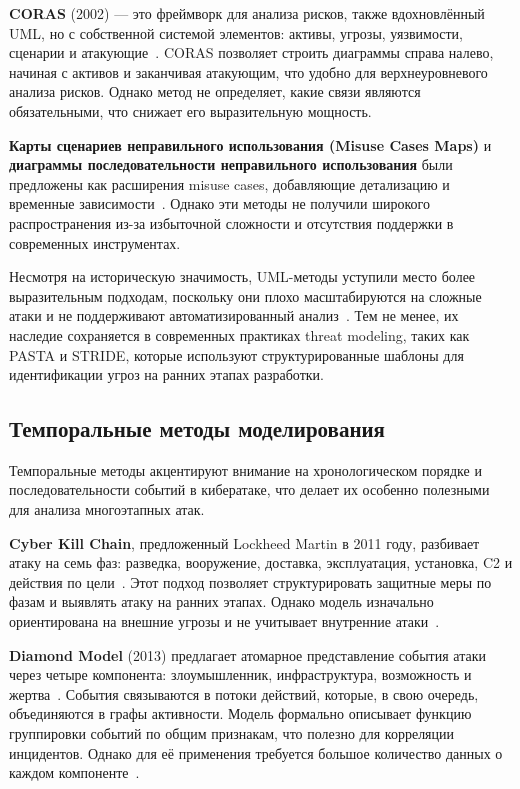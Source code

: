 \documentclass{article}
\begin{document}
\textbf{CORAS} (2002) — это фреймворк для анализа рисков, также вдохновлённый UML, но с собственной системой элементов: активы, угрозы, уязвимости, сценарии и атакующие~\cite{Neiman2024a}. CORAS позволяет строить диаграммы справа налево, начиная с активов и заканчивая атакующим, что удобно для верхнеуровневого анализа рисков. Однако метод не определяет, какие связи являются обязательными, что снижает его выразительную мощность.

\textbf{Карты сценариев неправильного использования (Misuse Cases Maps)} и \textbf{диаграммы последовательности неправильного использования} были предложены как расширения misuse cases, добавляющие детализацию и временные зависимости~\cite{Neiman2024a}. Однако эти методы не получили широкого распространения из-за избыточной сложности и отсутствия поддержки в современных инструментах.

Несмотря на историческую значимость, UML-методы уступили место более выразительным подходам, поскольку они плохо масштабируются на сложные атаки и не поддерживают автоматизированный анализ~\cite{Lallie2019}. Тем не менее, их наследие сохраняется в современных практиках threat modeling, таких как PASTA и STRIDE, которые используют структурированные шаблоны для идентификации угроз на ранних этапах разработки.

\subsection{Темпоральные методы моделирования}

Темпоральные методы акцентируют внимание на хронологическом порядке и последовательности событий в кибератаке, что делает их особенно полезными для анализа многоэтапных атак.

\textbf{Cyber Kill Chain}, предложенный Lockheed Martin в 2011 году, разбивает атаку на семь фаз: разведка, вооружение, доставка, эксплуатация, установка, C2 и действия по цели~\cite{Neiman2024b}. Этот подход позволяет структурировать защитные меры по фазам и выявлять атаку на ранних этапах. Однако модель изначально ориентирована на внешние угрозы и не учитывает внутренние атаки~\cite{Neiman2024b}.

\textbf{Diamond Model} (2013) предлагает атомарное представление события атаки через четыре компонента: злоумышленник, инфраструктура, возможность и жертва~\cite{Neiman2024b}. События связываются в потоки действий, которые, в свою очередь, объединяются в графы активности. Модель формально описывает функцию группировки событий по общим признакам, что полезно для корреляции инцидентов. Однако для её применения требуется большое количество данных о каждом компоненте~\cite{Neiman2024b}.
\end{document}
